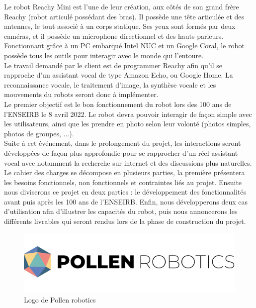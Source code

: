 Le robot Reachy Mini est l'une de leur création, aux côtés de son grand frère Reachy (robot articulé possédant des bras). Il possède une tête articulée et des antennes, le tout associé à un corps statique. Ses yeux sont formés par deux caméras, et il possède un microphone directionnel et des hauts parleurs. Fonctionnant grâce à un PC embarqué Intel NUC et un Google Coral, le robot possède tous les outils pour interagir avec le monde qui l'entoure. \\

Le travail demandé par le client est de programmer Reachy afin qu'il se rapproche d'un assistant vocal de type Amazon Echo, ou Google Home. La reconnaissance vocale, le traitement d'image, la synthèse vocale et les mouvements du robots seront donc à implémenter. \\

Le premier objectif est le bon fonctionnement du robot lors des 100 ans de l'ENSEIRB le 8 avril 2022. Le robot devra pouvoir interagir de façon simple avec les utilisateurs, ainsi que les prendre en photo selon leur volonté (photos simples, photos de groupes, ...). \\

Suite à cet événement, dans le prolongement du projet, les interactions seront développées de façon plus approfondie pour se rapprocher d'un réel assistant vocal avec notamment la recherche sur internet et des discussions plus naturelles. \\

Le cahier des charges se décompose en plusieurs parties, la première présentera les besoins fonctionnels, non fonctionnels et contraintes liés au projet. Ensuite nous diviserons ce projet en deux parties : le développement des fonctionnalités avant puis après les 100 ans de l'ENSEIRB.
Enfin, nous développerons deux cas d'utilisation afin d'illustrer les capacités du robot, puis nous annoncerons les différents livrables qui seront rendus lors de la phase de construction du projet.

\begin{center}
    \begin{figure}[!ht]
        \includegraphics[scale = 0.34]{pollen_robotics.jpg}
        \caption{Logo de Pollen robotics}
        \label{fig:logo}
        \end{figure}
\end{center}

